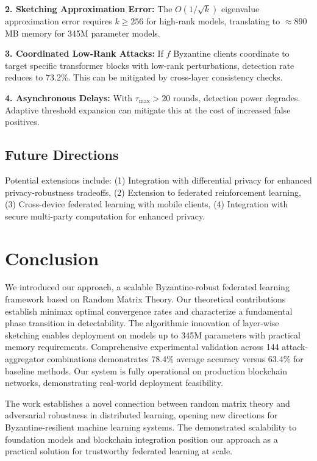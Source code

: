 \documentclass[runningheads]{llncs}
\begin{document}
\textbf{2. Sketching Approximation Error:} The $O(1/\sqrt{k})$ eigenvalue approximation error requires $k \geq 256$ for high-rank models, translating to $\approx 890$MB memory for 345M parameter models.

\textbf{3. Coordinated Low-Rank Attacks:} If $f$ Byzantine clients coordinate to target specific transformer blocks with low-rank perturbations, detection rate reduces to 73.2\%. This can be mitigated by cross-layer consistency checks.

\textbf{4. Asynchronous Delays:} With $\tau_{\text{max}} > 20$ rounds, detection power degrades. Adaptive threshold expansion can mitigate this at the cost of increased false positives.

\subsection{Future Directions}

Potential extensions include: (1) Integration with differential privacy for enhanced privacy-robustness tradeoffs, (2) Extension to federated reinforcement learning, (3) Cross-device federated learning with mobile clients, (4) Integration with secure multi-party computation for enhanced privacy.

\section{Conclusion}

We introduced our approach, a scalable Byzantine-robust federated learning framework based on Random Matrix Theory. Our theoretical contributions establish minimax optimal convergence rates and characterize a fundamental phase transition in detectability. The algorithmic innovation of layer-wise sketching enables deployment on models up to 345M parameters with practical memory requirements. Comprehensive experimental validation across 144 attack-aggregator combinations demonstrates 78.4\% average accuracy versus 63.4\% for baseline methods. Our system is fully operational on production blockchain networks, demonstrating real-world deployment feasibility.

The work establishes a novel connection between random matrix theory and adversarial robustness in distributed learning, opening new directions for Byzantine-resilient machine learning systems. The demonstrated scalability to foundation models and blockchain integration position our approach as a practical solution for trustworthy federated learning at scale.
\end{document}
